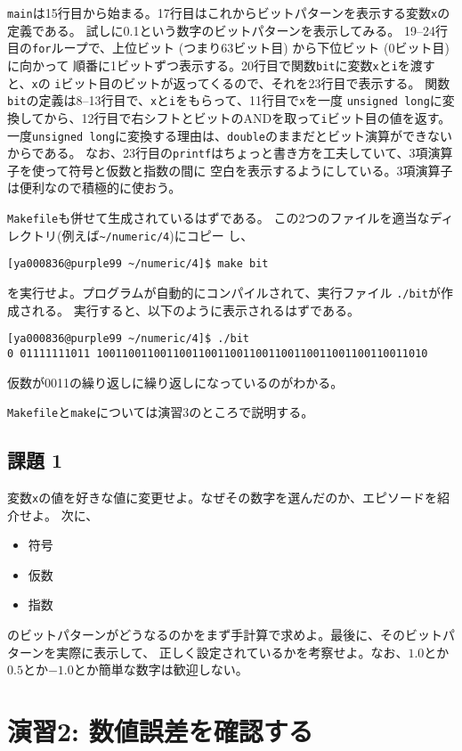 \documentclass[a4paper]{jsarticle}
\begin{document}
\texttt{main}は15行目から始まる。17行目はこれからビットパターンを表示する変数\texttt{x}の定義である。
試しに0.1という数字のビットパターンを表示してみる。
%
19--24行目の\texttt{for}ループで、上位ビット (つまり63ビット目) から下位ビット (0ビット目) に向かって
順番に1ビットずつ表示する。20行目で関数\texttt{bit}に変数\texttt{x}と\texttt{i}を渡すと、\texttt{x}の
\texttt{i}ビット目のビットが返ってくるので、それを23行目で表示する。
%
関数\texttt{bit}の定義は8--13行目で、\texttt{x}と\texttt{i}をもらって、11行目で\texttt{x}を一度
\texttt{unsigned long}に変換してから、12行目で右シフトとビットのANDを取って\texttt{i}ビット目の値を返す。
一度\texttt{unsigned long}に変換する理由は、\texttt{double}のままだとビット演算ができないからである。
%
なお、23行目の\texttt{printf}はちょっと書き方を工夫していて、3項演算子を使って符号と仮数と指数の間に
空白を表示するようにしている。3項演算子は便利なので積極的に使おう。

\texttt{Makefile}も併せて生成されているはずである。
この2つのファイルを適当なディレクトリ(例えば\texttt{\~{}/numeric/4})にコピー
し、
\begin{lstlisting}
[ya000836@purple99 ~/numeric/4]$ make bit
\end{lstlisting}
を実行せよ。プログラムが自動的にコンパイルされて、実行ファイル
\texttt{./bit}が作成される。
実行すると、以下のように表示されるはずである。
\begin{lstlisting}
[ya000836@purple99 ~/numeric/4]$ ./bit
0 01111111011 1001100110011001100110011001100110011001100110011010
\end{lstlisting}
仮数が0011の繰り返しに繰り返しになっているのがわかる。

\texttt{Makefile}と\texttt{make}については演習3のところで説明する。

\subsection*{課題 1}
変数\texttt{x}の値を好きな値に変更せよ。なぜその数字を選んだのか、エピソードを紹介せよ。
次に、
\begin{itemize}
\item 符号
\item 仮数
\item 指数
\end{itemize}
のビットパターンがどうなるのかをまず手計算で求めよ。最後に、そのビットパターンを実際に表示して、
正しく設定されているかを考察せよ。なお、$1.0$とか$0.5$とか$-1.0$とか簡単な数字は歓迎しない。

\section*{演習2: 数値誤差を確認する}
\end{document}
